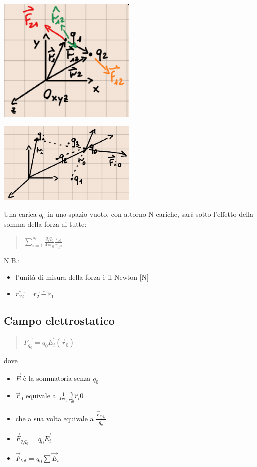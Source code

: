 \documentclass{book}
\begin{document}
\begin{center}
    \includegraphics*[width=0.5\textwidth]{coulomb_2.png}
\end{center}
\begin{center}
    \includegraphics*[width=0.5\textwidth]{coulomb_3.png}
\end{center}
Una carica $q_0$ in uno spazio vuoto, con attorno N cariche, sarà sotto l'effetto della somma della forza di tutte:
\begin{quote}
    \begin{math}
        \sum_{i = 1}^N \frac{q_iq_0}{4\pi\epsilon_0}\frac{\hat{r}_{i0}}{r_{{i0}^2}}
    \end{math}
\end{quote}
N.B.: \begin{itemize}
    \item l'unità di misura della forza è il Newton [N]
    \item \begin{math}
        \hat{r_{12}} = \hat{r_2 - r_1}
    \end{math}
\end{itemize}

\subsection{Campo elettrostatico}
\begin{quote}
    \begin{math}
        \vec{F_{q_0}} = q_0\vec{E}_i(\vec{r}_0)
    \end{math}
\end{quote}
dove
\begin{itemize}
    \item $\vec{E}$ è la sommatoria senza $q_0$
    \item $\vec{r}_0$ equivale a $\frac{1}{4\pi\epsilon_0}\frac{q_i}{r^2_{i0}}\hat{r}_i0$
    \item che a sua volta equivale a $\frac{\vec{F}_{q_iq_0}}{q_o}$
    \item $\vec{F}_{q_iq_0} = q_0\vec{E_i}$
    \item $\vec{F}_{tot} = q_0\sum \vec{E}_i$
\end{itemize}
\end{document}
